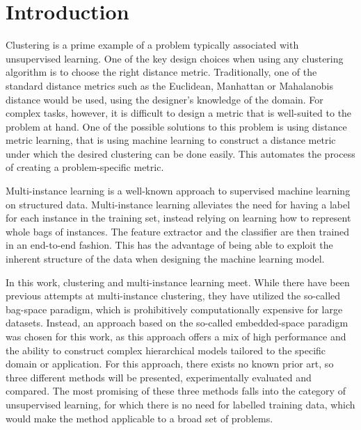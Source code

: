 \chapter*{Introduction}

Clustering is a prime example of a problem typically associated with unsupervised learning. One of the key design choices when using any clustering algorithm is to choose the right distance metric. Traditionally, one of the standard distance metrics such as the Euclidean, Manhattan or Mahalanobis distance would be used, using the designer's knowledge of the domain. For complex tasks, however, it is difficult to design a metric that is well-suited to the problem at hand. One of the possible solutions to this problem is using distance metric learning, that is using machine learning to construct a distance metric under which the desired clustering can be done easily. This automates the process of creating a problem-specific metric.

Multi-instance learning is a well-known approach to supervised machine learning on structured data. Multi-instance learning alleviates the need for having a label for each instance in the training set, instead relying on learning how to represent whole bags of instances. The feature extractor and the classifier are then trained in an end-to-end fashion. This has the advantage of being able to exploit the inherent structure of the data when designing the machine learning model.

In this work, clustering and multi-instance learning meet. While there have been previous attempts at multi-instance clustering, they have utilized the so-called bag-space paradigm, which is prohibitively computationally expensive for large datasets. Instead, an approach based on the so-called embedded-space paradigm was chosen for this work, as this approach offers a mix of high performance and the ability to construct complex hierarchical models tailored to the specific domain or application. For this approach, there exists no known prior art, so three different methods will be presented, experimentally evaluated and compared. The most promising of these three methods falls into the category of unsupervised learning, for which there is no need for labelled training data, which would make the method applicable to a broad set of problems.

